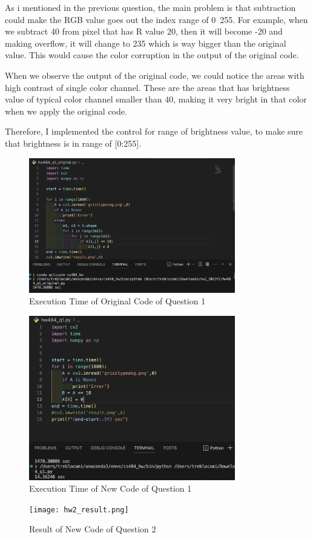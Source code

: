 \documentclass[11pt]{article}
\begin{document}
As i mentioned in the previous question, the main problem is that subtraction could make the RGB value goes out the index range of 0~255. For example, when we subtract 40 from pixel that has R value 20, then it will become -20 and making overflow, it will change to 235 which is way bigger than the original value. This would cause the color corruption in the output of the original code. 

When we observe the output of the original code, we could notice the areas with high contrast of single color channel. These are the areas that has brightness value of typical color channel smaller than 40, making it very bright in that color when we apply the original code.

Therefore, I implemented the control for range of brightness value, to make sure that brightness is in range of [0:255]. 
\pagebreak

\begin{figure}
\centerline{\includegraphics[width=9cm]{q1_original_execution.png}}
\caption{Execution Time of Original Code of Question 1}
\end{figure}

\begin{figure}
\centerline{\includegraphics[width=9cm]{q1_execution.png}}
\caption{Execution Time of New Code of Question 1}
\end{figure}

\begin{figure}
\centerline{\texttt{[image: hw2\_result.png]}}
\caption{Result of New Code of Question 2}
\end{figure}
\end{document}
